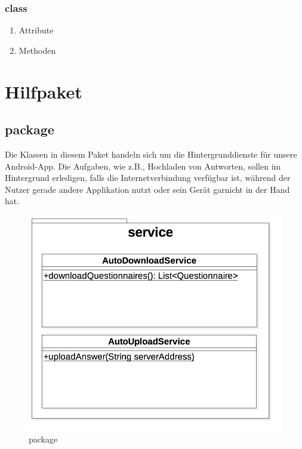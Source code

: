 \documentclass[a4paper]{scrreprt}
\begin{document}
                \subsubsection{class }
                 \begin{enumerate}
                        \item Attribute
                        \item Methoden
                \end{enumerate}


        \newpage
        \section{Hilfpaket}


            \subsection{package }

                Die Klassen in diesem Paket handeln sich um die Hintergrunddienste für unsere Android-App. Die Aufgaben, wie z.B., Hochladen von Antworten, sollen im Hintergrund erledigen, falls die Internetverbindung verfügbar ist, während der Nutzer gerade andere Applikation nutzt oder sein Gerät garnicht in der Hand hat.

                \vspace*{0.5cm}
                \begin{figure}[H]
                    \centering
                    \includegraphics[scale = 0.5]{service.jpg}
                    \caption{package }
                \end{figure}
\end{document}
